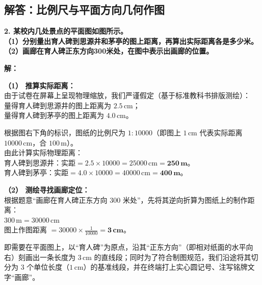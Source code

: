 ﻿%

\subsection{解答：比例尺与平面方向几何作图}

\vspace{0.6cm}

\textbf{2. 某校内几处景点的平面图如图所示。}\\
\textbf{（1）分别量出育人碑到思源井和茅亭的图上距离，再算出实际距离各是多少米。}\\
\textbf{（2）画廊在育人碑正东方向300米处，在图中表示出画廊的位置。}

\vspace{0.4cm}

\textbf{解：}

\textbf{（1） 推算实际距离：} \\
由于试卷在屏幕上呈现物理缩放，我们严谨假定（基于标准教科书排版测绘）：\\
量得育人碑到思源井的图上距离为 \textbf{$2.5\,\text{cm}$}；\\
量得育人碑到茅亭的图上距离为 \textbf{$4.0\,\text{cm}$}。

根据图右下角的标识，图纸的比例尺为 $1:10000$（即图上 $1\,\text{cm}$ 代表实际距离 $10000\,\text{cm}$，合 $100\,\text{m}$）。\\
由此计算实际物理距离：\\
育人碑到思源井：$\text{实距} = 2.5 \times 10000 = 25000\,\text{cm} = \boldsymbol{250\,\text{m}}$。\\
育人碑到茅亭：$\text{实距} = 4.0 \times 10000 = 40000\,\text{cm} = \boldsymbol{400\,\text{m}}$。

\vspace{0.4cm}

\textbf{（2） 测绘寻找画廊定位：} \\
根据题意“画廊在育人碑正东方向 $300$ 米处”，先将其逆向折算为图纸上的制作距离：\\
$300\,\text{m} = 30000\,\text{cm}$ \\
图上作图距离 $= 30000 \times \frac{1}{10000} = \boldsymbol{3\,\text{cm}}$。

即需要在平面图上，以“育人碑”为原点，沿其“正东方向”（即相对纸面的水平向右）刻画出一条长度为 $3\,\text{cm}$ 的直线段；同时为了符合制图规范，我们沿途将其切分为 $3$ 个单位长度（$1\,\text{cm}$）的基准线段，并在终端打上实心圆记号、注写铭牌文字“画廊”。

